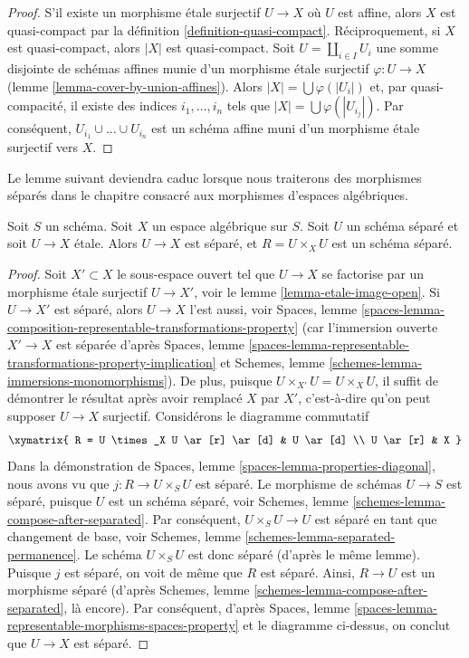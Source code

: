 \begin{proof}
S'il existe un morphisme étale surjectif $U \to X$ où $U$
est affine, alors $X$ est quasi-compact par la définition \ref{definition-quasi-compact}.
Réciproquement, si $X$ est quasi-compact, alors $|X|$ est quasi-compact.
Soit $U = \coprod_{i \in I} U_i$ une somme disjointe de schémas affines
munie d'un morphisme étale surjectif $\varphi : U \to X$
(lemme \ref{lemma-cover-by-union-affines}).
Alors $|X| = \bigcup \varphi(|U_i|)$ et,
par quasi-compacité, il existe des indices $i_1, \ldots, i_n$
tels que $|X| = \bigcup \varphi(|U_{i_j}|)$. Par conséquent,
$U_{i_1} \cup \ldots \cup U_{i_n}$ est un schéma affine muni d'un
morphisme étale surjectif vers $X$.
\end{proof}

\noindent
Le lemme suivant deviendra caduc lorsque nous traiterons des
morphismes séparés dans le chapitre consacré aux morphismes d'espaces algébriques.

\begin{lemma}
\label{lemma-separated-cover}
Soit $S$ un schéma.
Soit $X$ un espace algébrique sur $S$.
Soit $U$ un schéma séparé et soit $U \to X$ étale.
Alors $U \to X$ est séparé, et $R = U \times_X U$ est un schéma séparé.
\end{lemma}

\begin{proof}
Soit $X' \subset X$ le sous-espace ouvert tel que $U \to X$ se factorise
par un morphisme étale surjectif $U \to X'$, voir le
lemme \ref{lemma-etale-image-open}.
Si $U \to X'$ est séparé, alors $U \to X$ l'est aussi, voir
Spaces, lemme
\ref{spaces-lemma-composition-representable-transformations-property}
(car l'immersion ouverte $X' \to X$ est séparée d'après
Spaces, lemme
\ref{spaces-lemma-representable-transformations-property-implication}
et
Schemes, lemme \ref{schemes-lemma-immersions-monomorphisms}).
De plus, puisque $U \times_{X'} U = U \times_X U$, il suffit
de démontrer le résultat après avoir remplacé $X$ par $X'$, c'est-à-dire qu'on peut
supposer $U \to X$ surjectif.
Considérons le diagramme commutatif
$$
\xymatrix{
R = U \times_X U \ar[r] \ar[d] & U \ar[d] \\
U \ar[r] & X
}
$$
Dans la démonstration de
Spaces, lemme \ref{spaces-lemma-properties-diagonal},
nous avons vu que $j : R \to U \times_S U$ est séparé.
Le morphisme de schémas $U \to S$ est séparé, puisque $U$ est un schéma
séparé, voir
Schemes, lemme \ref{schemes-lemma-compose-after-separated}.
Par conséquent, $U \times_S U \to U$ est séparé en tant que changement de base, voir
Schemes, lemme \ref{schemes-lemma-separated-permanence}.
Le schéma $U \times_S U$ est donc séparé (d'après le même lemme).
Puisque $j$ est séparé, on voit de même que $R$ est séparé.
Ainsi, $R \to U$ est un morphisme séparé (d'après
Schemes, lemme \ref{schemes-lemma-compose-after-separated},
là encore). Par conséquent, d'après
Spaces, lemme \ref{spaces-lemma-representable-morphisms-spaces-property}
et le diagramme ci-dessus, on conclut que $U \to X$ est séparé.
\end{proof}

